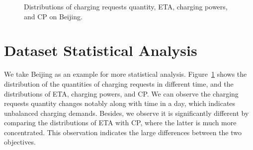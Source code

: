 \documentclass[sigconf]{acmart}
\newcommand{\beijing}{{\sc Beijing}\xspace}
\newcommand\figref[1]{Figure~\ref{#1}}
\begin{document}
\begin{figure}[htb]
\centering
{}
\caption{Distributions of charging requests quantity, ETA, charging powers, and CP on \beijing.}
\label{exp:data_dist}
\end{figure} 

\section{Dataset Statistical Analysis}
\label{app:data_analysis}
We take \beijing as an example for more statistical analysis. 
\figref{exp:data_dist} shows the distribution
of the quantities of charging requests in different time, and the distributions of ETA, charging powers, and CP. We can observe the charging requests quantity changes notably along with time in a day, which indicates unbalanced charging demands. Besides, we observe it is significantly different by comparing the distributions of ETA with CP, where the latter is much more concentrated. This observation indicates the large differences between the two objectives.
\end{document}
